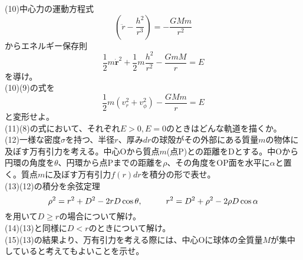 \documentclass{jsarticle}
\begin{document}
(10)中心力の運動方程式
\[\left(\ddot{r}-\frac{h^2}{r^3}\right)=-\frac{GMm}{r^2}\]
からエネルギー保存則
\[\frac{1}{2}m\dot{\bm{r}}^2+\frac{1}{2}m\frac{h^2}{r^2}-\frac{GmM}{r}=E\]
を導け。\\
(10)\hspace{3mm}(9)の式を
\[\frac{1}{2}m(v_{r}^2+v_{\phi}^2)-\frac{GMm}{r}=E\]
と変形せよ。\\
(11)\hspace{5mm}(8)の式において、それぞれ\(E>0,E=0\)のときはどんな軌道を描くか。\\
(12)一様な密度\(\sigma\)を持つ、半径\(r\)、厚み\(dr\)の球殻がその外部にある質量\(m\)の物体に及ぼす万有引力を考える。中心Oから質点\(m\)(点P)との距離をDとする。中Oから円環の角度を\(\theta\)、円環から点Pまでの距離を\(\rho\)、その角度をOP面を水平に\(\alpha\)と置く。質点\(m\)に及ぼす万有引力\(f(r)dr\)を積分の形で表せ。\\
(13)\hspace{3mm}(12)の積分を余弦定理
\[\rho^2=r^2+D^2-2rD\cos\theta,\hspace{10mm}
r^2=D^2+\rho^2-2\rho D\cos\alpha\]
を用いて\(D\geq r\)の場合について解け。\\
(14)\hspace{3mm}(13)と同様に\(D<r\)のときについて解け。\\
(15)\hspace{3mm}(13)の結果より、万有引力を考える際には、中心Oに球体の全質量\(M\)が集中していると考えてもよいことを示せ。

\newpage
\noindent
\end{document}
